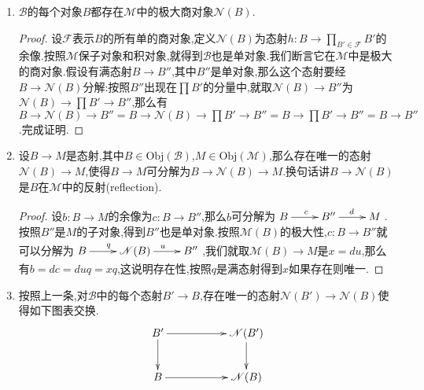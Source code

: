 \begin{enumerate}
\begin{proof}
		因为$A'\to A$是单态射,得到提升$B\to P$也是单态射.按照$M$是保单的,有$MB\to MP$也是单态射,特别的$\left(MB\to MP\right)\not=0$.于是$0\not=(EB\to EP)(y)=(EA'\to EP)(x)=(EA\to EP)(EA'\to EA)(x)=0$,这个矛盾迫使$E$是保单函子.
	\end{proof}
    \item $\mathscr{B}$的每个对象$B$都存在$\mathscr{M}$中的极大商对象$\mathscr{N}(B)$.
    \begin{proof}
    	
    	设$\mathscr{F}$表示$B$的所有单的商对象,定义$\mathscr{N}(B)$为态射$h:B\to\prod_{B'\in\mathscr{F}}B'$的余像.按照$\mathscr{M}$保子对象和积对象,就得到$\mathscr{B}$也是单对象.我们断言它在$\mathscr{M}$中是极大的商对象.假设有满态射$B\to B''$,其中$B''$是单对象,那么这个态射要经$B\to\mathscr{N}(B)$分解:按照$B''$出现在$\prod B'$的分量中,就取$\mathscr{N}(B)\to B''$为$\mathscr{N}(B)\to\prod B'\to B''$,那么有$B\to\mathscr{N}(B)\to B''=B\to\mathscr{N}(B)\to\prod B'\to B''=B\to\prod B'\to B''=B\to B''$.完成证明.
    \end{proof}
    \item 设$B\to M$是态射,其中$B\in\mathrm{Obj}(\mathscr{B})$,$M\in\mathrm{Obj}(\mathscr{M})$,那么存在唯一的态射$\mathscr{N}(B)\to M$,使得$B\to M$可分解为$B\to\mathscr{N}(B)\to M$.换句话讲$B\to\mathscr{N}(B)$是$B$在$\mathscr{M}$中的反射(reflection).
    \begin{proof}
    	
    	设$b:B\to M$的余像为$c:B\to B''$,那么$b$可分解为$\xymatrix{B\ar[r]^c&B''\ar[r]^d&M}$.按照$B''$是$M$的子对象,得到$B''$也是单对象.按照$\mathscr{M}(B)$的极大性,$c:B\to B''$就可以分解为$\xymatrix{B\ar[r]^q&\mathscr{N}(B)\ar[r]^u&B''}$,我们就取$\mathscr{M}(B)\to M$是$x=du$,那么有$b=dc=duq=xq$,这说明存在性,按照$q$是满态射得到$x$如果存在则唯一.
    \end{proof}
    \item 按照上一条,对$\mathscr{B}$中的每个态射$B'\to B$,存在唯一的态射$\mathscr{N}(B')\to\mathscr{N}(B)$使得如下图表交换.
    $$\xymatrix{B'\ar[rr]\ar[d]&&\mathscr{N}(B')\ar[d]\\B\ar[rr]&&\mathscr{N}(B)}$$
    

\end{enumerate}
